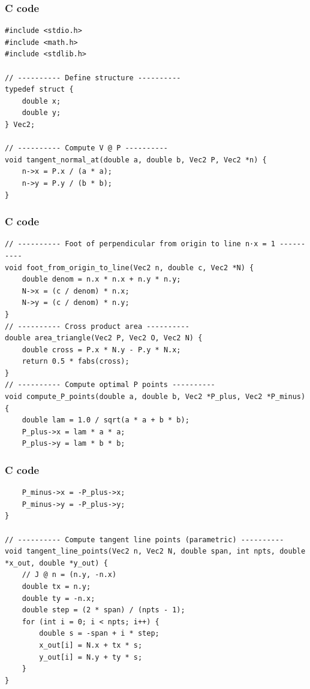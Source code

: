 \documentclass{beamer}
\begin{document}
\begin{frame}[fragile]
    \frametitle{C code}
    \begin{lstlisting}
#include <stdio.h>
#include <math.h>
#include <stdlib.h>

// ---------- Define structure ----------
typedef struct {
    double x;
    double y;
} Vec2;

// ---------- Compute V @ P ----------
void tangent_normal_at(double a, double b, Vec2 P, Vec2 *n) {
    n->x = P.x / (a * a);
    n->y = P.y / (b * b);
}
    \end{lstlisting}
\end{frame}

\begin{frame}[fragile]
    \frametitle{C code}
    \begin{lstlisting}
// ---------- Foot of perpendicular from origin to line n·x = 1 ----------
void foot_from_origin_to_line(Vec2 n, double c, Vec2 *N) {
    double denom = n.x * n.x + n.y * n.y;
    N->x = (c / denom) * n.x;
    N->y = (c / denom) * n.y;
}
// ---------- Cross product area ----------
double area_triangle(Vec2 P, Vec2 O, Vec2 N) {
    double cross = P.x * N.y - P.y * N.x;
    return 0.5 * fabs(cross);
}
// ---------- Compute optimal P points ----------
void compute_P_points(double a, double b, Vec2 *P_plus, Vec2 *P_minus) {
    double lam = 1.0 / sqrt(a * a + b * b);
    P_plus->x = lam * a * a;
    P_plus->y = lam * b * b;
    \end{lstlisting}
\end{frame}

\begin{frame}[fragile]
    \frametitle{C code}
    \begin{lstlisting}
    P_minus->x = -P_plus->x;
    P_minus->y = -P_plus->y;
}

// ---------- Compute tangent line points (parametric) ----------
void tangent_line_points(Vec2 n, Vec2 N, double span, int npts, double *x_out, double *y_out) {
    // J @ n = (n.y, -n.x)
    double tx = n.y;
    double ty = -n.x;
    double step = (2 * span) / (npts - 1);
    for (int i = 0; i < npts; i++) {
        double s = -span + i * step;
        x_out[i] = N.x + tx * s;
        y_out[i] = N.y + ty * s;
    }
}

    \end{lstlisting}
\end{frame}
\end{document}
